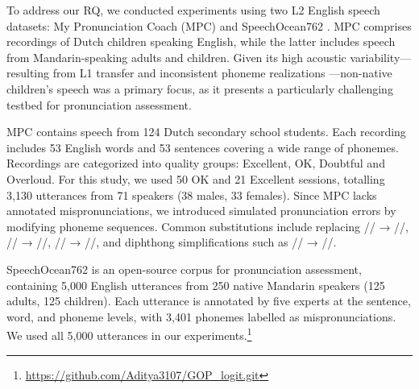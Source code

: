 \documentclass{Interspeech}
\begin{document}
To address our RQ, we conducted experiments using two L2 English speech datasets: My Pronunciation Coach (MPC) \cite{cucchiarini2012my} and SpeechOcean762 \cite{zhang2021speechocean762}. MPC comprises recordings of Dutch children speaking English, while the latter includes speech from Mandarin-speaking adults and children. Given its high acoustic variability—resulting from L1 transfer and inconsistent phoneme realizations \cite{gretter21_interspeech}—non-native children's speech was a primary focus, as it presents a particularly challenging testbed for pronunciation assessment.

MPC \cite{cucchiarini2012my} contains speech from 124 Dutch secondary school students. Each recording includes 53 English words and 53 sentences covering a wide range of phonemes. Recordings are categorized into quality groups: Excellent, OK, Doubtful and Overloud. For this study, we used 50 OK and 21 Excellent sessions, totalling 3,130 utterances from 71 speakers (38 males, 33 females).
%
Since MPC lacks annotated mispronunciations, we introduced simulated pronunciation errors by modifying phoneme sequences. Common substitutions include replacing /\textipa{\dh}/ → //, // → //, /\textipa{\ae}/ → //, and diphthong simplifications such as // → //.

SpeechOcean762 \cite{zhang2021speechocean762} is an open-source corpus for pronunciation assessment, containing 5,000 English utterances from 250 native Mandarin speakers (125 adults, 125 children). Each utterance is annotated by five experts at the sentence, word, and phoneme levels, with 3,401 phonemes labelled as mispronunciations. We used all 5,000 utterances in our experiments.\footnote{\tiny{\url{https://github.com/Aditya3107/GOP_logit.git}}}


\end{document}
